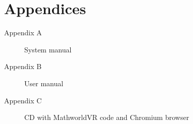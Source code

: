\section*{Appendices}
\thispagestyle{empty}

\begin{description}
	\item[Appendix A] System manual
	\item[Appendix B] User manual
	\item[Appendix C] CD with MathworldVR code and Chromium browser
\end{description}
